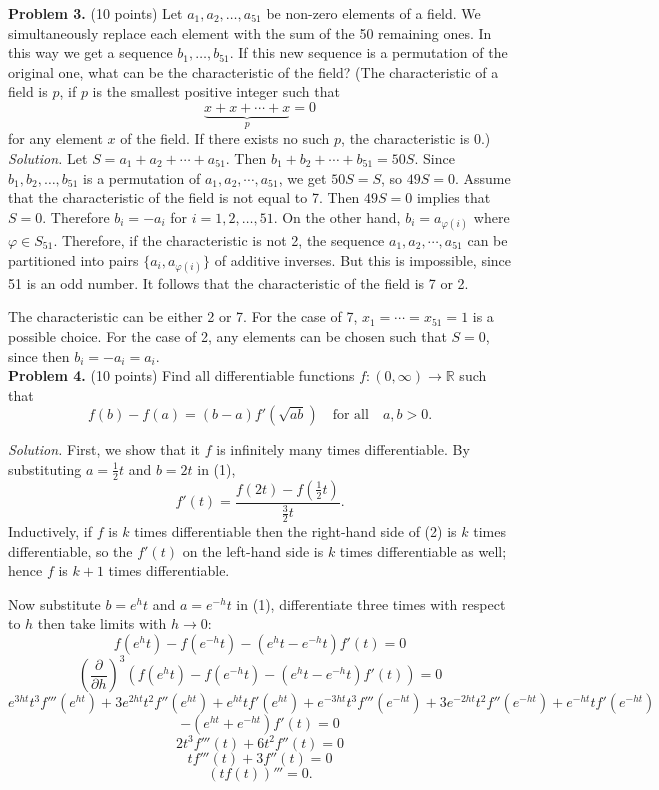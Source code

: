 \documentclass{article}
\begin{document}
\textbf{Problem 3.} (10 points)
Let $a_1, a_2, \ldots, a_{51}$ be non-zero elements of a field. We simultaneously replace each element with the sum of the 50 remaining ones. In this way we get a sequence $b_1, \ldots, b_{51}$. If this new sequence is a permutation of the original one, what can be the characteristic of the field? (The characteristic of a field is $p$, if $p$ is the smallest positive integer such that
\[
\underbrace{x + x + \cdots + x}_{p} = 0
\]
for any element $x$ of the field. If there exists no such $p$, the characteristic is 0.) \\

\textit{Solution.} Let $S = a_1 + a_2 + \cdots + a_{51}$. Then $b_1 + b_2 + \cdots + b_{51} = 50S$. Since $b_1, b_2, \ldots, b_{51}$ is a permutation of $a_1, a_2, \cdots, a_{51}$, we get $50S = S$, so $49S = 0$. Assume that the characteristic of the field is not equal to 7. Then $49S = 0$ implies that $S = 0$. Therefore $b_i = -a_i$ for $i = 1, 2, \ldots, 51$. On the other hand, $b_i = a_{\varphi(i)}$ where $\varphi \in S_{51}$. Therefore, if the characteristic is not 2, the sequence $a_1, a_2, \cdots, a_{51}$ can be partitioned into pairs $\{a_i, a_{\varphi(i)}\}$ of additive inverses. But this is impossible, since 51 is an odd number. It follows that the characteristic of the field is 7 or 2.

The characteristic can be either 2 or 7. For the case of 7, $x_1 = \cdots = x_{51} = 1$ is a possible choice. For the case of 2, any elements can be chosen such that $S = 0$, since then $b_i = -a_i = a_i$. \\

\textbf{Problem 4.} (10 points)
Find all differentiable functions $f : (0, \infty) \to \mathbb{R}$ such that
\[
f(b) - f(a) = (b - a) f'\left( \sqrt{ab} \right) \quad \text{for all} \quad a, b > 0. \tag{1}
\]

\textit{Solution.} First, we show that it $f$ is infinitely many times differentiable.
By substituting $a = \frac{1}{2}t$ and $b = 2t$ in (1),
\[
f'(t) = \frac{f(2t) - f\left(\frac{1}{2}t\right)}{\frac{3}{2}t}. \tag{2}
\]
Inductively, if $f$ is $k$ times differentiable
then the right-hand side of (2) is $k$ times differentiable, so the $f'(t)$ on the left-hand side is $k$ times differentiable as well; hence $f$ is $k + 1$ times differentiable.

Now substitute $b = e^{h}t$ and $a = e^{-h}t$ in (1), differentiate three times with respect to $h$ then take limits with $h \to 0$:
\[
f(e^{h}t) - f(e^{-h}t) - (e^{h}t - e^{-h}t)f'(t) = 0
\]
\[
\left( \frac{\partial}{\partial h} \right)^3 \left( f(e^{h}t) - f(e^{-h}t) - (e^{h}t - e^{-h}t)f'(t) \right) = 0
\]
\[
e^{3ht} t^3 f'''(e^{ht}) + 3e^{2ht} t^2 f''(e^{ht}) + e^{ht} t f'(e^{ht}) + e^{-3ht} t^3 f'''(e^{-ht}) + 3e^{-2ht} t^2 f''(e^{-ht}) + e^{-ht} t f'(e^{-ht})
\]
\[
- (e^{ht} + e^{-ht}) f'(t) = 0
\]
\[
2t^3 f'''(t) + 6t^2 f''(t) = 0
\]
\[
t f'''(t) + 3 f''(t) = 0
\]
\[
(t f(t))''' = 0.
\]
\end{document}

